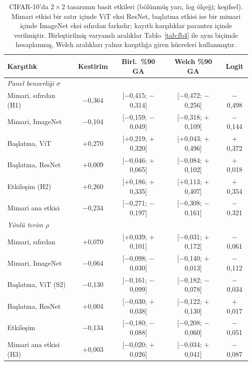 \begin{table}[!t]
\centering
\caption{CIFAR-10'da $2\times2$ tasarımın basit etkileri (bölünmüş yarı, log ölçeği; keşifsel). Mimari etkisi bir satır içinde ViT eksi ResNet, başlatma etkisi ise bir mimari içinde ImageNet eksi sıfırdan farkıdır; kayıtlı karşılıklar parantez içinde verilmiştir. Birleştirilmiş varyanslı aralıklar Tablo~\ref{tab:fb4} ile aynı biçimde hesaplanmış, Welch aralıkları yalnız karşıtlığa giren hücreleri kullanmıştır.}
\label{tab:simple_effects}
\scriptsize
\setlength{\tabcolsep}{2.5pt}
\begin{tabular}{lcccc}
\toprule
\textbf{Karşıtlık} & \textbf{Kestirim} & \textbf{Birl.\ \%90 GA} & \textbf{Welch \%90 GA} & \textbf{Logit} \\
\midrule
\multicolumn{5}{l}{\textit{Panel benzerliği $\sigma$}} \\
Mimari, sıfırdan (H1) & $-$0,364 & [$-$0,415; $-$0,314] & [$-$0,472; $-$0,256] & $-$0,498 \\
Mimari, ImageNet & $-$0,104 & [$-$0,159; $-$0,049] & [$-$0,318; $+$0,109] & $-$0,144 \\
Başlatma, ViT & $+$0,270 & [$+$0,219; $+$0,320] & [$+$0,043; $+$0,496] & $+$0,372 \\
Başlatma, ResNet & $+$0,009 & [$-$0,046; $+$0,065] & [$-$0,084; $+$0,102] & $+$0,018 \\
Etkileşim (H2) & $+$0,260 & [$+$0,186; $+$0,335] & [$+$0,113; $+$0,407] & $+$0,354 \\
Mimari ana etkisi & $-$0,234 & [$-$0,271; $-$0,197] & [$-$0,308; $-$0,161] & $-$0,321 \\
\midrule
\multicolumn{5}{l}{\textit{Yönlü terim $\rho$}} \\
Mimari, sıfırdan & $+$0,070 & [$+$0,039; $+$0,101] & [$-$0,031; $+$0,172] & $-$0,061 \\
Mimari, ImageNet & $-$0,064 & [$-$0,098; $-$0,030] & [$-$0,140; $+$0,013] & $-$0,112 \\
Başlatma, ViT (S2) & $-$0,130 & [$-$0,161; $-$0,099] & [$-$0,182; $-$0,078] & $-$0,034 \\
Başlatma, ResNet & $+$0,004 & [$-$0,030; $+$0,038] & [$-$0,122; $+$0,130] & $+$0,017 \\
Etkileşim & $-$0,134 & [$-$0,180; $-$0,088] & [$-$0,208; $-$0,060] & $-$0,051 \\
Mimari ana etkisi (H3) & $+$0,003 & [$-$0,020; $+$0,026] & [$-$0,034; $+$0,041] & $-$0,087 \\
\bottomrule
\end{tabular}
\end{table}

